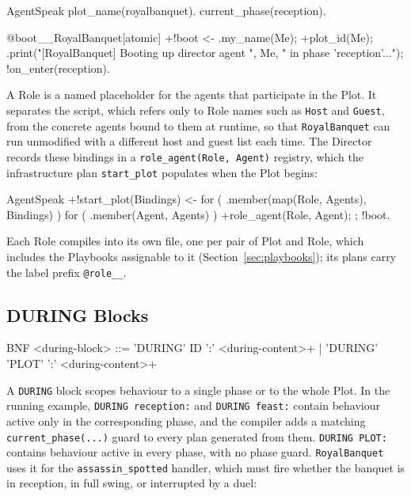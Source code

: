 \begin{codeblock}[]{AgentSpeak}
plot_name(royalbanquet).
current_phase(reception).
 
@boot__RoyalBanquet[atomic]
+!boot <-
    .my_name(Me);
    +plot_id(Me);
    .print("[RoyalBanquet] Booting up director agent ", Me,
        " in phase 'reception'...");
    !on_enter(reception).
\end{codeblock}
 
A Role is a named placeholder for the agents that participate in the Plot. It separates the script, which refers only to Role names such as \lstinline|Host| and \lstinline|Guest|, from the concrete agents bound to them at runtime, so that \lstinline|RoyalBanquet| can run unmodified with a different host and guest list each time. The Director records these bindings in a \lstinline|role_agent(Role, Agent)| registry, which the infrastructure plan \lstinline|start_plot| populates when the Plot begins:
 
\begin{codeblock}[]{AgentSpeak}
+!start_plot(Bindings) <-
    for ( .member(map(Role, Agents), Bindings) ) {
        for ( .member(Agent, Agents) ) {
            +role_agent(Role, Agent);
        }
    };
    !boot.
\end{codeblock}
 
Each Role compiles into its own file, one per pair of Plot and Role, which includes the Playbooks assignable to it (Section~\ref{sec:playbooks}); its plans carry the label prefix \lstinline|@role__|.
 
\subsection{DURING Blocks}
\label{sec:during-blocks}
\begin{codeblock}[]{BNF}
    <during-block>   ::= 'DURING' ID ':' <during-content>+
                       | 'DURING' 'PLOT' ':' <during-content>+
\end{codeblock}
 
A \lstinline|DURING| block scopes behaviour to a single phase or to the whole Plot. In the running example, \lstinline|DURING reception:| and \lstinline|DURING feast:| contain behaviour active only in the corresponding phase, and the compiler adds a matching \lstinline|current_phase(...)| guard to every plan generated from them. \lstinline|DURING PLOT:| contains behaviour active in every phase, with no phase guard. \lstinline|RoyalBanquet| uses it for the \lstinline|assassin_spotted| handler, which must fire whether the banquet is in reception, in full swing, or interrupted by a duel:
 
